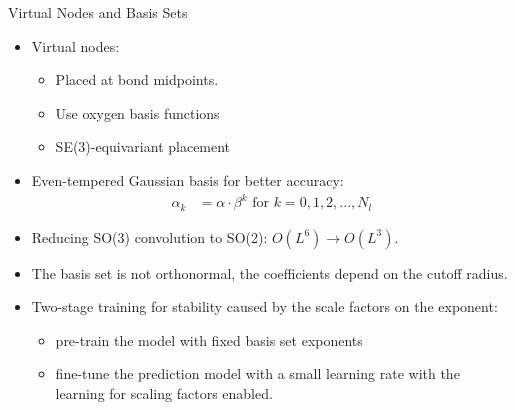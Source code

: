 \begin{frame}{Virtual Nodes and Basis Sets}
    \begin{itemize}
        \item Virtual nodes:
        \begin{itemize}
            \item Placed at bond midpoints.
            \item Use oxygen basis functions
            \item SE(3)-equivariant placement
        \end{itemize}
        \item Even-tempered Gaussian basis for better accuracy:
        \begin{align*}
            \alpha_k &= \alpha \cdot \beta^k \text{ for } k = 0,1,2,...,N_l
        \end{align*}
        \item  Reducing SO(3) convolution to SO(2): $O(L^6) \rightarrow O(L^3)$.
        \item  The basis set is not orthonormal, the coefficients depend on the
        cutoff radius.
        \item Two-stage training for stability caused by the scale factors
        on the exponent:
        \begin{itemize}
            \item pre-train the model with fixed basis set exponents
            \item fine-tune the prediction model with a small learning rate with
            the learning for scaling factors enabled.
        \end{itemize}
    \end{itemize}
\end{frame}


